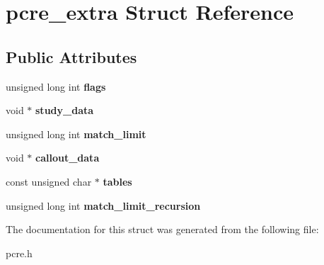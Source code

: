 \hypertarget{structpcre__extra}{
\section{pcre\_\-extra Struct Reference}
\label{structpcre__extra}
}
\subsection*{Public Attributes}
\begin{DoxyCompactItemize}
\item 
\hypertarget{structpcre__extra_a2a7957f7f9d15b3b69f8652b2f50ecb3}{
unsigned long int {\bfseries flags}}
\label{structpcre__extra_a2a7957f7f9d15b3b69f8652b2f50ecb3}

\item 
\hypertarget{structpcre__extra_a27f29bdf9c4526d5bb3fb8ee514ee8e8}{
void $\ast$ {\bfseries study\_\-data}}
\label{structpcre__extra_a27f29bdf9c4526d5bb3fb8ee514ee8e8}

\item 
\hypertarget{structpcre__extra_aa1a16c13f086255baba34f5e8a180186}{
unsigned long int {\bfseries match\_\-limit}}
\label{structpcre__extra_aa1a16c13f086255baba34f5e8a180186}

\item 
\hypertarget{structpcre__extra_aef88fa059796850ca7f00842f5d88e8c}{
void $\ast$ {\bfseries callout\_\-data}}
\label{structpcre__extra_aef88fa059796850ca7f00842f5d88e8c}

\item 
\hypertarget{structpcre__extra_ae79d65e283cef92ecb9afe6961c46a4e}{
const unsigned char $\ast$ {\bfseries tables}}
\label{structpcre__extra_ae79d65e283cef92ecb9afe6961c46a4e}

\item 
\hypertarget{structpcre__extra_ac62a2bd02946b6b1e59615f15c903b37}{
unsigned long int {\bfseries match\_\-limit\_\-recursion}}
\label{structpcre__extra_ac62a2bd02946b6b1e59615f15c903b37}

\end{DoxyCompactItemize}


The documentation for this struct was generated from the following file:\begin{DoxyCompactItemize}
\item 
pcre.h\end{DoxyCompactItemize}
